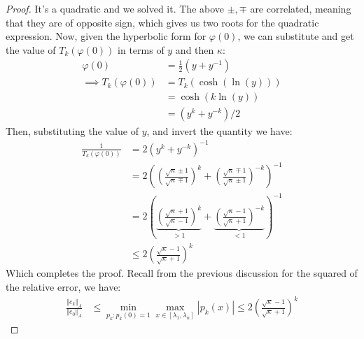 \documentclass[]{article}
\theoremstyle{definition}
\begin{document}
\begin{proof}
                It's a quadratic and we solved it. The above $\pm, \mp$ are correlated, meaning that they are of opposite sign, which gives us two roots for the quadratic expression. Now, given the hyperbolic form for $\varphi(0)$, we can substitute and get the value of $T_k(\varphi(0))$ in terms of $y$ and then $\kappa$: 
                \begin{align}
                    \varphi(0)&= \frac{1}{2}(y + y^{-1})
                    \\
                    \implies 
                    T_k(\varphi(0)) &= 
                    T_k(\cosh(\ln(y)))
                    \\
                    &= \cosh(k\ln(y))
                    \\
                    &= (y^k + y^{-k})/2
                \end{align}
                Then, substituting the value of $y$, and invert the quantity we have: 
                \begin{align}
                    \frac{1}{T_k(\varphi(0))} &= 2(y^k + y^{-k})^{-1}
                    \\
                    &= 
                    2\left(
                        \left(
                            \frac{\sqrt{\kappa}\pm 1}{\sqrt{\kappa}\mp 1}
                        \right)^{k} + 
                        \left(
                            \frac{\sqrt{\kappa}\mp 1}{\sqrt{\kappa}\pm 1}
                        \right)^{-k}
                    \right)^{-1}
                    \\
                    &= 2\left(
                        \underbrace{\left(
                            \frac{\sqrt{\kappa}+ 1}{\sqrt{\kappa}- 1}
                        \right)^{k}}_{> 1} + 
                        \underbrace{\left(
                            \frac{\sqrt{\kappa}- 1}{\sqrt{\kappa}+ 1}
                        \right)^{-k}}_{ < 1}
                    \right)^{-1}\label{line:CG_Cheb_Bound}
                    \\
                    & \le 2 \left(
                        \frac{\sqrt{\kappa} - 1}{\sqrt{\kappa} + 1}
                    \right)^k
                \end{align}
                Which completes the proof. Recall from the previous discussion for the squared of the relative error, we have: 
                \begin{align}
                    \frac{\Vert e_k\Vert_A}{\Vert e_0\Vert_A} &\le 
                    \min_{p_{k}: p_{k}(0) = 1}\max_{x\in [\lambda_{1}, \lambda_{n}]} |p_{k}(x)| \le 
                    2 \left(
                        \frac{\sqrt{\kappa} - 1}{\sqrt{\kappa} + 1}
                    \right)^k
                \end{align}

            \end{proof}
\end{document}
